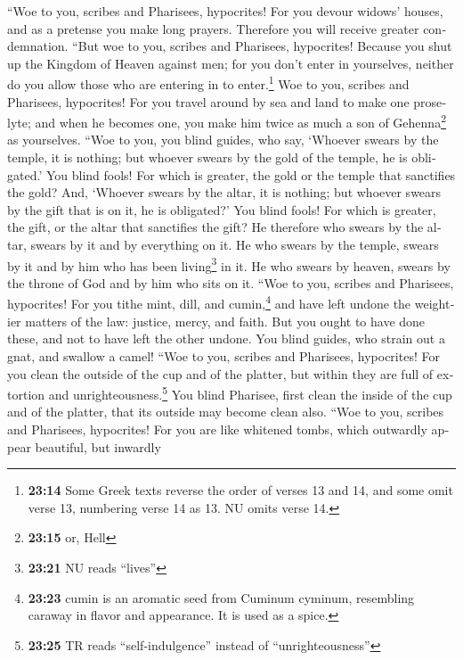 \begin{paracol}{2}
\begin{otherlanguage}{english}
 ``Woe to you, scribes and Pharisees, hypocrites! For you
devour widows' houses, and as a pretense you make long prayers.
Therefore you will receive greater condemnation.  ``But
woe to you, scribes and Pharisees, hypocrites! Because you shut up the
Kingdom of Heaven against men; for you don't enter in yourselves,
neither do you allow those who are entering in to enter.\footnote{\textbf{23:14}
  Some Greek texts reverse the order of verses 13 and 14, and some omit
  verse 13, numbering verse 14 as 13. NU omits verse 14.}
 Woe to you, scribes and Pharisees, hypocrites! For you
travel around by sea and land to make one proselyte; and when he becomes
one, you make him twice as much a son of Gehenna\footnote{\textbf{23:15}
  or, Hell} as yourselves.  ``Woe to you, you blind
guides, who say, `Whoever swears by the temple, it is nothing; but
whoever swears by the gold of the temple, he is obligated.'
 You blind fools! For which is greater, the gold or the
temple that sanctifies the gold?  And, `Whoever swears by
the altar, it is nothing; but whoever swears by the gift that is on it,
he is obligated?'  You blind fools! For which is greater,
the gift, or the altar that sanctifies the gift?  He
therefore who swears by the altar, swears by it and by everything on it.
 He who swears by the temple, swears by it and by him who
has been living\footnote{\textbf{23:21} NU reads ``lives''} in it.
 He who swears by heaven, swears by the throne of God and
by him who sits on it.  ``Woe to you, scribes and
Pharisees, hypocrites! For you tithe mint, dill, and cumin,\footnote{\textbf{23:23}
  cumin is an aromatic seed from Cuminum cyminum, resembling caraway in
  flavor and appearance. It is used as a spice.} and have left undone
the weightier matters of the law: justice, mercy, and faith. But you
ought to have done these, and not to have left the other undone.
 You blind guides, who strain out a gnat, and swallow a
camel!  ``Woe to you, scribes and Pharisees, hypocrites!
For you clean the outside of the cup and of the platter, but within they
are full of extortion and unrighteousness.\footnote{\textbf{23:25} TR
  reads ``self-indulgence'' instead of ``unrighteousness''}
 You blind Pharisee, first clean the inside of the cup
and of the platter, that its outside may become clean also.
 ``Woe to you, scribes and Pharisees, hypocrites! For you
are like whitened tombs, which outwardly appear beautiful, but inwardly

\end{otherlanguage}
\end{paracol}
